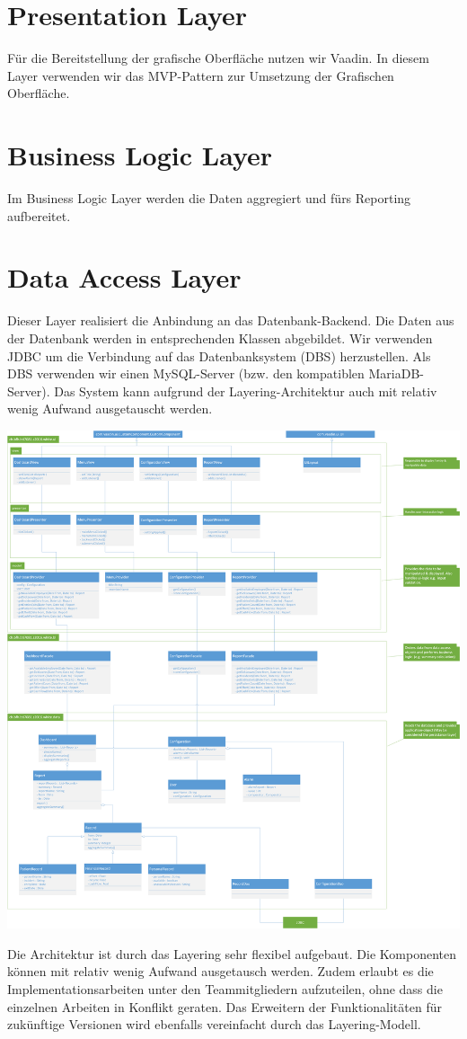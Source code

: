\documentclass[a4paper]{scrreprt}
\begin{document}
\section{Presentation Layer}
Für die Bereitstellung der grafische Oberfläche nutzen wir Vaadin. In diesem Layer verwenden wir das MVP-Pattern zur Umsetzung der Grafischen Oberfläche.



\section{Business Logic Layer}
Im Business Logic Layer werden die Daten aggregiert und fürs Reporting aufbereitet.


\section{Data Access Layer}
Dieser Layer realisiert die Anbindung an das Datenbank-Backend. Die Daten aus der Datenbank werden in entsprechenden Klassen abgebildet.
Wir verwenden JDBC um die Verbindung auf das Datenbanksystem (DBS) herzustellen. Als DBS verwenden wir einen MySQL-Server (bzw. den kompatiblen MariaDB-Server). Das System kann aufgrund der Layering-Architektur auch mit relativ wenig Aufwand ausgetauscht werden.



\pagebreak

\includegraphics[width=1\textwidth]{img/architecture_overview.png}

\bigskip

Die Architektur ist durch das Layering sehr flexibel aufgebaut. Die Komponenten können mit relativ wenig Aufwand ausgetausch werden. Zudem erlaubt es die Implementationsarbeiten unter den Teammitgliedern aufzuteilen, ohne dass die einzelnen Arbeiten in Konflikt geraten.
Das Erweitern der Funktionalitäten für zukünftige Versionen wird ebenfalls vereinfacht durch das Layering-Modell.
\end{document}
